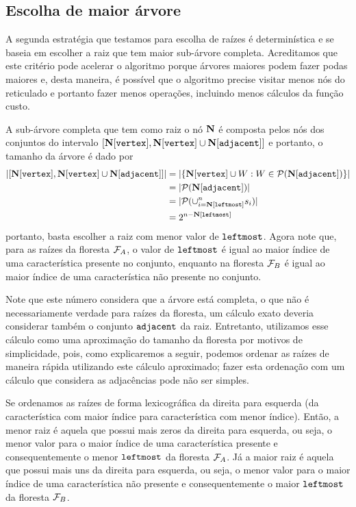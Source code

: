 \subsection{Escolha de maior árvore}
A segunda estratégia que testamos para escolha de raízes é 
determinística e se baseia em escolher a raiz que tem maior 
sub-árvore completa. Acreditamos que este critério pode acelerar o
algoritmo porque árvores maiores podem fazer podas maiores e, desta 
maneira, é possível que o algoritmo precise visitar menos nós do 
reticulado e portanto fazer menos operações, incluindo menos cálculos
da função custo.

A sub-árvore completa que tem como raiz o nó $\mathbf N$ é composta 
pelos nós dos conjuntos do intervalo 
$[\mathbf N[\texttt{vertex}], \mathbf N[\texttt{vertex}] \cup \mathbf N[\texttt{adjacent}]]$ e 
portanto, o tamanho da árvore é dado por
\begin{align*}
|[\mathbf N[\texttt{vertex}], \mathbf N[\texttt{vertex}] \cup \mathbf N[\texttt{adjacent}]]| &= 
|\{\mathbf N[\texttt{vertex}] \cup W : W \in \mathcal{P} (\mathbf N[\texttt{adjacent}])\}| \\
    &= |\mathcal{P}(\mathbf N[\texttt{adjacent}])| \\
    &= |\mathcal{P}(\cup_{i = \mathbf N[\texttt{leftmost}]}^{n} s_i)| \\
    &= 2^{n - \mathbf N[\texttt{leftmost}]} 
\end{align*}
portanto, basta escolher a raiz com menor valor de $\texttt{leftmost}$.
Agora note que, para as raízes da floresta $\mathcal{F}_A$, o valor de 
$\texttt{leftmost}$ é igual ao maior índice de uma característica
presente no conjunto, enquanto na floresta $\mathcal{F}_B$ é igual ao maior
índice de uma característica não presente no conjunto.

Note que este número considera que a árvore está completa, o que não é
necessariamente verdade para raízes da floresta, um cálculo exato 
deveria considerar também o conjunto $\texttt{adjacent}$ da raiz. 
Entretanto, utilizamos esse cálculo como uma aproximação do tamanho da 
floresta por motivos de simplicidade, pois, como explicaremos a seguir,
podemos ordenar as raízes de maneira rápida utilizando este cálculo 
aproximado; fazer esta ordenação com um cálculo que considera as 
adjacências pode não ser simples.

Se ordenamos as raízes de forma lexicográfica da direita
para esquerda (da característica com maior índice para característica
com menor índice). Então, a menor raiz é aquela que possui mais zeros
da direita para esquerda, ou seja, o menor valor para o maior índice
de uma característica presente e consequentemente o menor 
$\texttt{leftmost}$ da floresta $\mathcal{F}_A$. Já a maior raiz é aquela 
que possui mais uns da direita para esquerda, ou seja, o menor valor 
para o maior índice de uma característica não presente e 
consequentemente o maior $\texttt{leftmost}$ da floresta $\mathcal{F}_B$.

